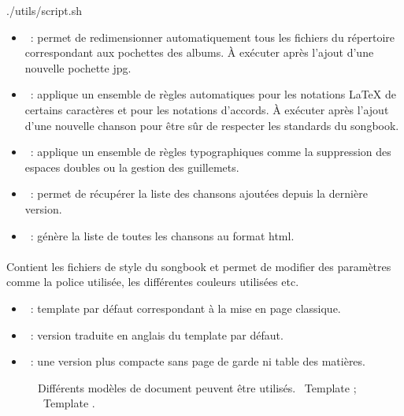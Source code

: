 \begin{unix}
  ./utils/script.sh
\end{unix}

\begin{itemize}
\item {}~: permet de redimensionner
  automatiquement tous les fichiers  du répertoire
   correspondant aux pochettes des albums. À
  exécuter après l'ajout d'une nouvelle pochette jpg.

\item {}~: applique un ensemble de règles
  automatiques pour les notations \LaTeX{} de certains caractères et
  pour les notations d'accords. À exécuter après l'ajout d'une
  nouvelle chanson pour être sûr de respecter les standards du
  songbook.

\item {}~: applique un ensemble de règles typographiques
  comme la suppression des espaces doubles ou la gestion des
  guillemets.

\item {}~: permet de récupérer la liste des
  chansons ajoutées depuis la dernière version.

\item {}~: génère la liste de toutes les chansons au
  format html.
\end{itemize}

\paragraph{}
Contient les fichiers de style du songbook et permet de modifier des
paramètres comme la police utilisée, les différentes couleurs
utilisées etc.

\begin{itemize}
\item {}~: template par défaut correspondant à la
  mise en page classique.
\item {}~: version traduite en anglais du
  template par défaut.
\item {}~: une version plus compacte sans page de
  garde ni table des matières.
\end{itemize}

\begin{figure}
  \centering
  \hspace{0.1cm}%
  \caption[Templates]{%
    Différents modèles de document peuvent être utilisés.
    ~Template ; %
    ~Template .%
  }%
  \label{fig:templates}
\end{figure}


